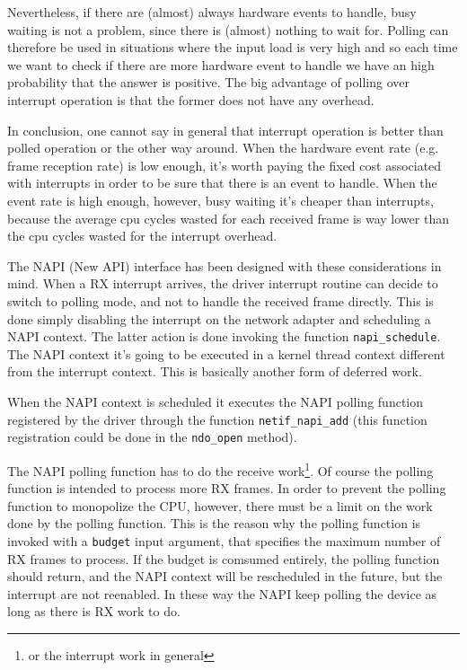 Nevertheless, if there are (almost) always hardware events to handle, busy waiting is not a problem, since there is (almost) nothing to
wait for.
Polling can therefore be used in situations where the input load is very high and so each time we want to check if there are more hardware
event to handle we have an high probability that the answer is positive. The big advantage of polling over interrupt operation is that
the former does not have any overhead.

\vspace{0.5cm}

In conclusion, one cannot say in general that interrupt operation is better than polled operation or the other way around. When the hardware
event rate (e.g. frame reception rate) is low enough, it's worth paying the fixed cost associated with interrupts in order to be sure that
there is an event to handle. When the event rate is high enough, however, busy waiting it's cheaper than interrupts, because the average 
cpu cycles wasted for each received frame is way lower than the cpu cycles wasted for the interrupt overhead.

\vspace{0.5cm}

The NAPI (New API) interface has been designed with these considerations in mind. When a RX interrupt arrives, the driver interrupt routine
can decide to switch to polling mode, and not to handle the received frame directly.
This is done simply disabling the interrupt on the network adapter and scheduling a NAPI context. The latter action is done invoking the 
function \texttt{napi\_schedule}.
The NAPI context it's going to be executed in a kernel thread context different from the interrupt context. This is basically another form of
deferred work.

When the NAPI context is scheduled it executes the NAPI polling function registered by the driver through the function 
\texttt{netif\_napi\_add} (this function registration could be done in the \texttt{ndo\_open} method).

The NAPI polling function has to do the receive work\footnote{or the interrupt work in general}. Of course the polling function is intended
to process more RX frames. In order to prevent the polling function to monopolize the CPU, however, there must be a limit on the work done
by the polling function. This is the reason why the polling function is invoked with a \texttt{budget} input argument, that specifies the
maximum number of RX frames to process.
If the budget is comsumed entirely, the polling function should return, and the NAPI context will be rescheduled in the future, but
the interrupt are not reenabled. In these way the NAPI keep polling the device as long as there is RX work to do.

